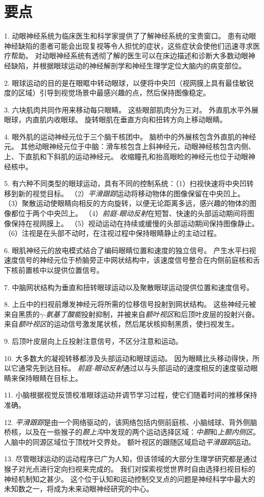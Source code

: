 \section{要点}

1. 动眼神经系统为临床医生和科学家提供了了解神经系统的宝贵窗口。
患有动眼神经缺陷的患者可能会出现复视等令人担忧的症状，这些症状会使他们迅速寻求医疗帮助。
对动眼神经系统有透彻了解的医生可以在床边描述和诊断大多数动眼神经缺陷，并根据眼球运动的神经解剖学和神经生理学定位大脑内的病变部位。


2. 眼球运动的目的是在眼眶中转动眼球，以便将中央凹（视网膜上具有最佳敏锐度的区域）引导到视觉场景中最感兴趣的点，然后保持图像稳定。


3. 六块肌肉共同作用来移动每只眼睛。
这些眼部肌肉分为三对。
外直肌水平外展眼球，内直肌内收眼球。
旋转眼肌在垂直方向和扭转方向上移动眼睛。


4. 眼外肌的运动神经元位于三个脑干核团中。
脑桥中的外展核包含外直肌的神经元。
其他动眼神经元位于中脑：滑车核包含上斜神经元，动眼神经核包含内侧、上、下直肌和下斜肌的运动神经元。
收缩瞳孔和抬高眼睑的神经元也位于动眼神经核中。


5. 有六种不同类型的眼球运动，具有不同的控制系统：（1）扫视快速将中央凹转移到新的视觉目标。
（2）\textit{平滑跟踪}运动将移动物体的图像保留在中央凹上。
（3）聚散运动使眼睛向相反的方向旋转，以便无论距离多远，感兴趣的物体的图像都位于两个中央凹上。
（4）\textit{前庭-眼动反射}在短暂、快速的头部运动期间将图像保持在视网膜上。
（5）视动运动在持续或缓慢的头部运动期间保持图像静止。
（6）注视是在头部不动时，在注视过程中保持眼睛静止的主动过程。


6. 眼肌神经元的放电模式结合了编码眼睛位置和速度的独立信号。
产生水平扫视速度信号的神经元位于桥脑旁正中网状结构中，该速度信号整合在内侧前庭核和舌下核前置核中以提供位置信号。


7. 中脑网状结构为垂直和扭转眼球运动以及聚散眼球运动提供位置和速度信号。


8. 上丘中的扫视前爆发神经元将所需的位移信号投射到网状结构。
这些神经元被来自黑质的\textit{$ \gamma $-氨基丁酸能}投射抑制，并被来自\textit{额叶视区}和后顶叶皮层的投射兴奋。
来自\textit{额叶视区}的运动信号激发尾状核，然后尾状核抑制黑质，使扫视发生。


9. 后顶叶皮层向上丘投射注意信号，不区分注意和运动。


10. 大多数大的凝视转移都涉及头部运动和眼球运动。
因为眼睛比头移动得快，所以它通常先到达目标。
\textit{前庭-眼动反射}通过以与头部运动的速度相反的速度驱动眼睛来保持眼睛在目标上。


11. 小脑根据视觉反馈校准眼球运动并调节学习过程，使它们随着时间的推移保持准确。


12. \textit{平滑跟踪}是由一个网络驱动的，该网络包括内侧前庭核、小脑绒球、背外侧脑桥核，以及在一些猴子的\textit{颞上沟}中发现的两个运动选择区域：\textit{中颞}和\textit{上颞内侧区}。
人脑中的同源区域位于顶枕叶交界处。
额叶视区的跟随区域启动\textit{平滑跟踪}运动。


13. 尽管眼球运动的运动程序已广为人知，但该领域的大部分生理学研究都是通过猴子对光点进行定向扫视来完成的。
我们对探索视觉世界时自由选择扫视目标的神经机制知之甚少。
这个位于认知和运动控制交叉点的问题是神经科学中最大的未知数之一，将成为未来动眼神经研究的中心。




